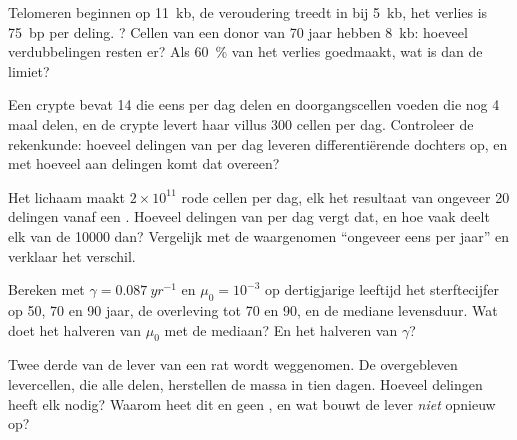 \begin{exercise}[$\star\star$]\label{exo:b3:stem-cells:5}
Telomeren beginnen op \qty{11}{kb}, de veroudering treedt in bij
\qty{5}{kb}, het verlies is \qty{75}{bp} per deling. ? Cellen van een donor van 70 jaar hebben \qty{8}{kb}: hoeveel
verdubbelingen resten er? Als  \qty{60}{\%} van het verlies
goedmaakt, wat is dan de limiet?
\end{exercise}

\begin{exercise}[$\star\star$]\label{exo:b3:stem-cells:6}
Een crypte bevat 14  die eens per dag delen en doorgangscellen
voeden die nog 4 maal delen, en de crypte levert haar villus \num{300}
cellen per dag. Controleer de rekenkunde: hoeveel delingen van
 per dag leveren differentiërende dochters op, en met hoeveel
 aan delingen komt dat overeen?
\end{exercise}

\begin{exercise}[$\star\star$]\label{exo:b3:stem-cells:7}
Het lichaam maakt $2\times 10^{11}$ rode cellen per dag, elk het
resultaat van ongeveer 20 delingen vanaf een . Hoeveel delingen
van  per dag vergt dat, en hoe vaak deelt elk van de
\num{10000}  dan? Vergelijk met de waargenomen ``ongeveer
eens per jaar'' en verklaar het verschil.
\end{exercise}

\begin{exercise}[$\star\star$]\label{exo:b3:stem-cells:8}
Bereken met $\gamma = \qty{0.087}{yr^{-1}}$ en $\mu_{0} = 10^{-3}$ op
dertigjarige leeftijd het sterftecijfer op 50, 70 en 90 jaar, de
overleving tot 70 en 90, en de mediane levensduur. Wat doet het
halveren van $\mu_{0}$ met de mediaan? En het halveren van $\gamma$?
\end{exercise}

\begin{exercise}[$\star\star$]\label{exo:b3:stem-cells:9}
Twee derde van de lever van een rat wordt weggenomen. De overgebleven
levercellen, die alle delen, herstellen de massa in tien dagen. Hoeveel
delingen heeft elk nodig? Waarom heet dit  en geen
, en wat bouwt de lever \emph{niet} opnieuw op?
\end{exercise}

